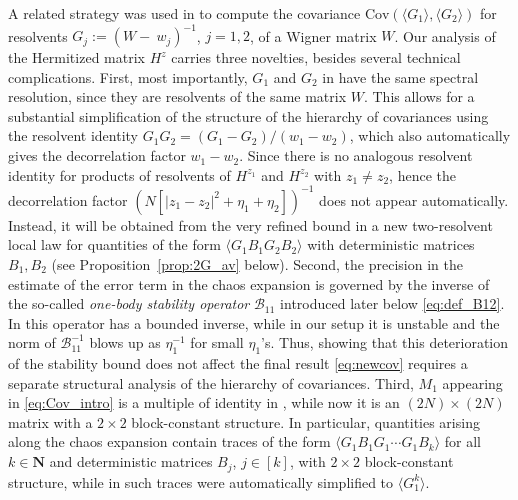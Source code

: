 \documentclass[10pt]{amsart}
\numberwithin{equation}{section}
\newcommand{\N}{\mathbf{N}}
\begin{document}
A related strategy was used in \cite{he2020mesoscopic} to compute the covariance $\mathrm{Cov}(\langle G_1\rangle, \langle G_2\rangle)$ for resolvents $G_j:=(W-~\!w_j)^{-1}$, $j=1,2$, of a Wigner matrix $W$. Our analysis of the Hermitized matrix $H^z$ carries three novelties, besides several technical complications.  First, most importantly,  $G_1$ and $G_2$ in \cite{he2020mesoscopic}  have the same spectral resolution, since they are resolvents of the same matrix $W$. This allows for a substantial  simplification of the structure of the hierarchy of covariances using the resolvent identity $G_1G_2=(G_1-G_2)/(w_1-w_2)$, which also automatically gives the decorrelation factor $w_1-w_2$. Since there is no analogous resolvent identity for products of resolvents of $H^{z_1}$ and $H^{z_2}$ with $z_1\neq z_2$, hence the decorrelation factor $(N[|z_1-z_2|^2+\eta_1+\eta_2])^{-1}$ does not appear automatically. Instead, it will be obtained from the very refined bound in a new two-resolvent local law for quantities of the form $\langle G_1B_1G_2B_2\rangle$ with deterministic matrices $B_1,B_2$ (see Proposition~\ref{prop:2G_av} below). Second, the precision in the estimate of the error term in the chaos expansion is governed by the inverse of the so-called \emph{one-body stability operator} $\mathcal{B}_{11}$ introduced later below \eqref{eq:def_B12}. In \cite{he2020mesoscopic} this operator has a bounded inverse, while in our setup it is unstable and the norm of $\mathcal{B}_{11}^{-1}$ blows up as $\eta_1^{-1}$ for small $\eta_1$'s. Thus, showing that this deterioration of the stability bound does not affect the final result \eqref{eq:newcov} requires a separate structural analysis of the hierarchy of covariances. Third, $M_1$ appearing in \eqref{eq:Cov_intro} is a multiple of identity in \cite{he2020mesoscopic}, while now it is an $(2N)\times (2N)$ matrix with a $2\times 2$ block-constant structure. In particular, quantities arising along the chaos expansion contain traces of the form $\langle G_1B_1G_1\cdots G_1B_k\rangle$ for all $k\in\N$ and deterministic matrices $B_j$, $j\in[k]$, with $2\times 2$ block-constant structure, while in \cite{he2020mesoscopic} such traces were automatically simplified to $\langle G_1^k\rangle$.


   
\end{document}
